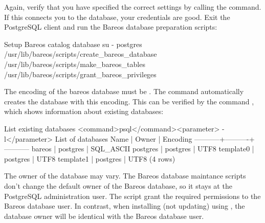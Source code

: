 Again, verify that you have specified the correct settings by calling the  command.
If this connects you to the database, your credentials are good.
Exit the PostgreSQL client and run the Bareos database preparation scripts:
\begin{commands}{Setup Bareos catalog database}
su - postgres
/usr/lib/bareos/scripts/create_bareos_database
/usr/lib/bareos/scripts/make_bareos_tables
/usr/lib/bareos/scripts/grant_bareos_privileges
\end{commands}


The encoding of the bareos database must be .
The command  automatically creates the database with this encoding.
This can be verified by the command , which  shows information about existing databases:
\begin{commands}{List existing databases}
<command>psql</command><parameter> -l</parameter>
        List of databases
   Name    |  Owner   | Encoding
-----------+----------+-----------
 bareos    | postgres | SQL_ASCII
 postgres  | postgres | UTF8
 template0 | postgres | UTF8
 template1 | postgres | UTF8
(4 rows)
\end{commands}

The owner of the database may vary. The Bareos database maintance scripts don't change the default owner of the Bareos database, so it stays at the PostgreSQL administration user. The  script grant the required permissions to the Bareos database user. In contrast, when installing (not updating) using , the database owner will be identical with the Bareos database user.



